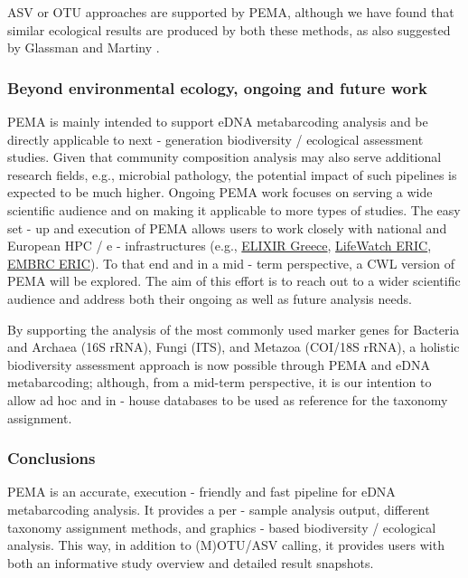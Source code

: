    ASV or OTU approaches are supported by PEMA, although we have found that similar ecological results are produced by both these methods, as also suggested by Glassman and Martiny \citep{glassman2018broadscale}.

   \subsubsection*{Beyond environmental ecology, ongoing and future work}
   \label{subsec:pema-future}

   PEMA is mainly intended to support eDNA metabarcoding analysis and be directly applicable to next - generation biodiversity / ecological assessment studies. 
   Given that community composition analysis may also serve additional research fields, e.g., microbial pathology, the potential impact of such pipelines is expected to be much higher. 
   Ongoing PEMA work focuses on serving a wide scientific audience and on making it applicable to more types of studies. 
   The easy set - up and execution of PEMA allows users to work closely with national and European HPC / e - infrastructures (e.g., \href{https://www.elixir-greece.org/}{ELIXIR Greece}, \href{https://www.lifewatch.eu/}{LifeWatch ERIC}, \href{ http://www.embrc.eu}{EMBRC ERIC}). 
   To that end and in a mid - term perspective, a CWL version of PEMA will be explored. 
   The aim of this effort is to reach out to a wider scientific audience and address both their ongoing as well as future analysis needs.

   By supporting the analysis of the most commonly used marker genes for Bacteria and Archaea (16S rRNA), Fungi (ITS), and Metazoa (COI/18S rRNA), a holistic biodiversity assessment approach is now possible through PEMA and eDNA metabarcoding; although, from a mid-term perspective, it is our intention to allow ad hoc and in - house databases to be used as reference for the taxonomy assignment.

   \subsubsection*{Conclusions}
   \label{subsec:pema-conclusion}

   PEMA is an accurate, execution - friendly and fast pipeline for eDNA metabarcoding analysis. 
   It provides a per - sample analysis output, different taxonomy assignment methods, and graphics - based biodiversity / ecological analysis. 
   This way, in addition to (M)OTU/ASV calling, it provides users with both an informative study overview and detailed result snapshots.

